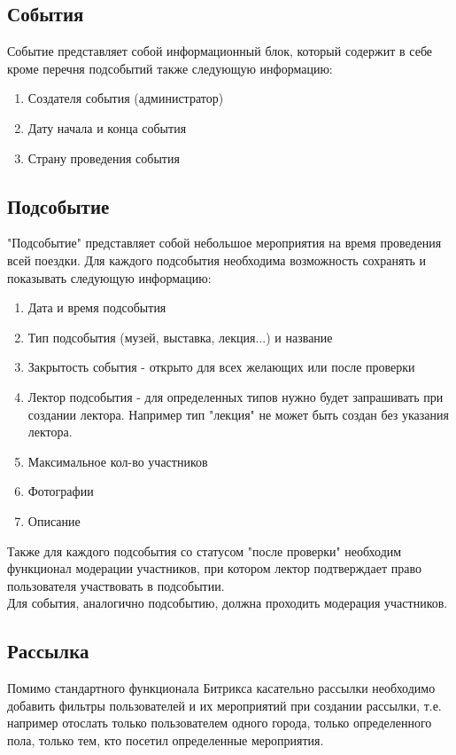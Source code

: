 \documentclass[DIV=calc, paper=a4, fontsize=11pt]{scrartcl} %
\begin{document}
\subsection{События}
Событие представляет собой информационный блок, который содержит в себе кроме перечня подсобытий также следующую информацию:

    \begin{enumerate}
        \item Создателя события (администратор) 
        \item Дату начала и конца события
        \item Страну проведения события 
    \end{enumerate}
    
\subsection{Подсобытие}
"Подсобытие" представляет собой небольшое мероприятия на время проведения всей поездки. Для каждого подсобытия необходима возможность сохранять и показывать следующую информацию:


    \begin{enumerate}
        \item Дата и время подсобытия
        \item Тип подсобытия (музей, выставка, лекция...) и название
        \item Закрытость события - открыто для всех желающих или после проверки
        \item Лектор подсобытия - для определенных типов нужно будет запрашивать при создании лектора. Например тип "лекция" не может быть создан без указания лектора.
        \item Максимальное кол-во участников
        \item Фотографии
        \item Описание
    \end{enumerate}
Также для каждого подсобытия со статусом "после проверки" необходим функционал модерации участников, при котором лектор  подтверждает право пользователя участвовать в подсобытии.
\\[0.5cm]
Для события, аналогично подсобытию, должна проходить модерация участников.

\subsection{Рассылка}
Помимо стандартного функционала Битрикса касательно рассылки необходимо добавить фильтры пользователей и их мероприятий при создании рассылки, т.е. например отослать только пользователем одного города, только определенного пола, только тем, кто посетил определенные мероприятия.
\end{document}
